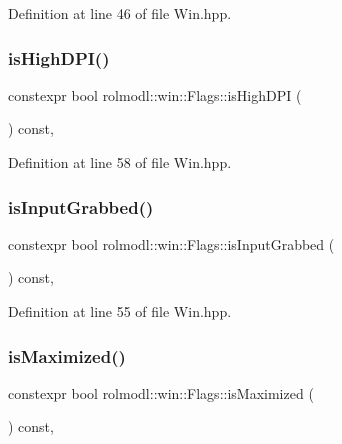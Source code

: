 Definition at line 46 of file Win.\+hpp.

\mbox{\label{structrolmodl_1_1win_1_1_flags_a11e8e848df5120fb07b1088b53103021}} 
\subsubsection{\texorpdfstring{isHighDPI()}{isHighDPI()}}
{\footnotesize\ttfamily constexpr bool rolmodl\+::win\+::\+Flags\+::is\+High\+D\+PI (\begin{DoxyParamCaption}{ }\end{DoxyParamCaption}) const\hspace{0.3cm}{\ttfamily [inline]}, {\ttfamily [noexcept]}}



Definition at line 58 of file Win.\+hpp.

\mbox{\label{structrolmodl_1_1win_1_1_flags_a877f7e2a27418e74c2123e192cc3c8e9}} 
\subsubsection{\texorpdfstring{isInputGrabbed()}{isInputGrabbed()}}
{\footnotesize\ttfamily constexpr bool rolmodl\+::win\+::\+Flags\+::is\+Input\+Grabbed (\begin{DoxyParamCaption}{ }\end{DoxyParamCaption}) const\hspace{0.3cm}{\ttfamily [inline]}, {\ttfamily [noexcept]}}



Definition at line 55 of file Win.\+hpp.

\mbox{\label{structrolmodl_1_1win_1_1_flags_adc44df6fb0405dbc6b1607c74c308176}} 
\subsubsection{\texorpdfstring{isMaximized()}{isMaximized()}}
{\footnotesize\ttfamily constexpr bool rolmodl\+::win\+::\+Flags\+::is\+Maximized (\begin{DoxyParamCaption}{ }\end{DoxyParamCaption}) const\hspace{0.3cm}{\ttfamily [inline]}, {\ttfamily [noexcept]}}



